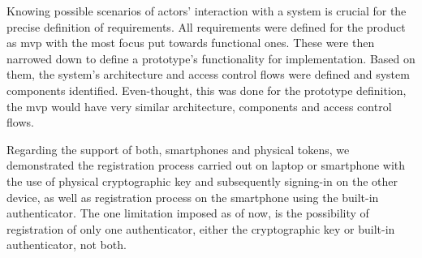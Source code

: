 Knowing possible scenarios of actors' interaction with a system is crucial for the precise definition of requirements. All requirements were defined for the product as \acrlong{mvp} with the most focus put towards functional ones. These were then narrowed down to define a prototype's functionality for implementation. Based on them, the system's architecture and access control flows were defined and system components identified. Even-thought, this was done for the prototype definition, the \acrshort{mvp} would have very similar architecture, components and access control flows.

Regarding the support of both, smartphones and physical tokens, we demonstrated the registration process carried out on laptop or smartphone with the use of physical cryptographic key and subsequently signing-in on the other device, as well as registration process on the smartphone using the built-in authenticator. The one limitation imposed as of now, is the possibility of registration of only one authenticator, either the cryptographic key or built-in authenticator, not both.